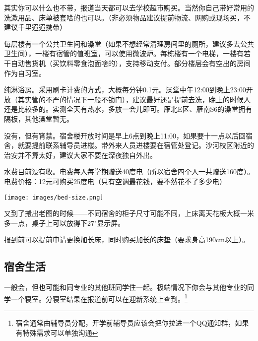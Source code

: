 
其实你可以什么也不带，报道当天都可以去学校超市购买。当然你自己带好常用的洗漱用品、床单被套啥的也可以。（非必须物品建议提前物流、网购或现场买，不建议千里迢迢携带）


每层楼有一个公共卫生间和澡堂（如果不想经常清理房间里的厕所，建议多去公共卫生间），一楼有宿管的值班室，可以使用微波炉。每栋楼有一个电梯，一楼有若干自动售货机（买饮料零食泡面啥的），支持移动支付。部分楼层会有空出的房间作为自习室。


纯淋浴房。采用刷卡计费的方式，大概每分钟0.1元。澡堂中午12:00到晚上23:00开放（其实管的不严的情况下一般不锁门），建议最好还是提前去洗，晚上的时候人还是比较多的。实测全天有热水，多放一会儿即可。雁北E区、雁南S6的澡堂拥有隔板，其他澡堂暂无。


没有，但有宵禁。宿舍楼开放时间是早上6点到晚上11:00，如果要十一点以后回宿舍，就要提前联系辅导员进楼。带外来人员进楼要在宿管处登记。沙河校区附近的治安并不算太好，建议大家不要在深夜独自外出。


水费目前没有收。电费每人每学期赠送40度电（所以宿舍四个人一共赠送160度）。电费价格：12元可购买25度电（只有空调最花钱，要不然花不了多少电）


\begin{center}
    \texttt{[image: images/bed-size.png]}
\end{center}

又到了搬出老图的时候——不同宿舍的柜子尺寸可能不同，上床离天花板大概一米多一点，桌子上可以放得下27"显示屏。


报到前可以提前申请更换加长床，同时购买加长的床垫（要求身高190cm以上）。

\subsection{宿舍生活}


一般会，但也可能和同专业的其他班同学住一起。极端情况下你会与其他专业的同学一个寝室。分寝室结果在报道前可以在\href{https://welcome.bupt.edu.cn/}{迎新系统}上查到。\footnote{宿舍通常由辅导员分配，开学前辅导员应该会把你拉进一个QQ通知群，如果有特殊需求可以单独沟通}

